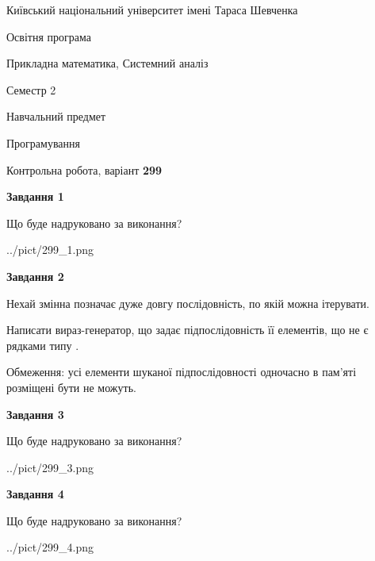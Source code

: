 \documentclass[12pt, ukrainian]{article}
\begin{document}
{{\begin {small}\par
{ \center  Київський національний університет імені Тараса Шевченка \par}
{\parbox {5 cm}{Освітня програма \hfill}{\parbox {8 cm}{Прикладна математика, Системний аналіз \hfill}}\parbox {5 cm}{\hfill Семестр 2}}\par
{\parbox {5 cm} {Навчальний предмет \hfill}\parbox {7 cm}{Програмування \hfill}\parbox {6cm}{\hfill}\par}\vspace{-7pt} \end{small}}{\center Контрольна робота, варіант  \No \textbf
{ 299 }\par}}
{
\begin {large}
{\begin {center}\textbf{Завдання 1}\end {center}}\par
Що буде надруковано за виконання?\par\par
\begin{center}
	{../pict/299_1.png}
\end{center}
\newpage

{\begin {center}\textbf{Завдання 2}\end {center}}\par
Нехай змінна  позначає дуже довгу послідовність, по якій можна ітерувати.

Написати вираз-генератор, що задає підпослідовність її елементів, що не є рядками типу .

Обмеження: усі елементи шуканої підпослідовності одночасно в пам'яті розміщені бути не можуть.\par
\newpage

{\begin {center}\textbf{Завдання 3}\end {center}}\par
Що буде надруковано за виконання?
\begin{center}
	{../pict/299_3.png}
\end{center}
\newpage

{\begin {center}\textbf{Завдання 4}\end {center}}\par
Що буде надруковано за виконання?\par
\begin{center}
	{../pict/299_4.png}
\end{center}
\newpage


\end{large}}
\end{document}
